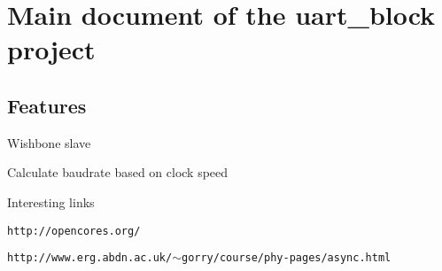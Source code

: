 \section*{Main document of the uart\-\_\-block project}

\par
 \subsection*{Features}

Wishbone slave \par
 Calculate baudrate based on clock speed \par
\par
 Interesting links \par
 {\tt http\-://opencores.\-org/} \par
 {\tt http\-://www.\-erg.\-abdn.\-ac.\-uk/$\sim$gorry/course/phy-\/pages/async.\-html} \par
 